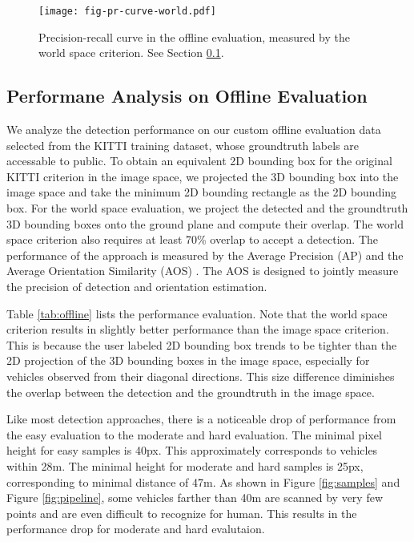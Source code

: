 \documentclass[conference]{IEEEtran}
\begin{document}
\begin{figure}
    \centering
    \texttt{[image: fig-pr-curve-world.pdf]}
    \caption{Precision-recall curve in the offline evaluation, measured by the world space criterion. See Section \ref{sec:offline}. }
    \label{fig:curve}
\end{figure}

\subsection{Performane Analysis on Offline Evaluation}
\label{sec:offline}
We analyze the detection performance on our custom offline evaluation data selected from the KITTI training dataset, whose groundtruth labels are accessable to public. To obtain an equivalent 2D bounding box for the original KITTI criterion in the image space, we projected the 3D bounding box into the image space and take the minimum 2D bounding rectangle as the 2D bounding box. For the world space evaluation, we project the detected and the groundtruth 3D bounding boxes onto the ground plane and compute their overlap. The world space criterion also requires at least 70\% overlap to accept a detection. The performance of the approach is measured by the Average Precision (AP) and the Average Orientation Similarity (AOS) \cite{Geiger2012}. The AOS is designed to jointly measure the precision of detection and orientation estimation.

Table \ref{tab:offline} lists the performance evaluation. Note that the world space criterion results in slightly better performance than the image space criterion. This is because the user labeled 2D bounding box trends to be tighter than the 2D projection of the 3D bounding boxes in the image space, especially for vehicles observed from their diagonal directions. This size difference diminishes the overlap between the detection and the groundtruth in the image space.

Like most detection approaches, there is a noticeable drop of performance from the easy evaluation to the moderate and hard evaluation. The minimal pixel height for easy samples is 40px. This approximately corresponds to vehicles within 28m. The minimal height for moderate and hard samples is 25px, corresponding to minimal distance of 47m. As shown in Figure \ref{fig:samples} and Figure \ref{fig:pipeline}, some vehicles farther than 40m are scanned by very few points and are even difficult to recognize for human. This results in the performance drop for moderate and hard evalutaion.
\end{document}

